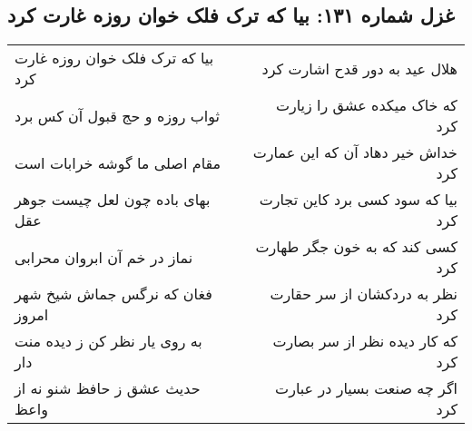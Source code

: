 \begin{center}
\section*{غزل شماره ۱۳۱: بیا که ترک فلک خوان روزه غارت کرد}
\label{sec:sh131}
\begin{longtable}{l p{0.5cm} r}
بیا که ترک فلک خوان روزه غارت کرد
&&
هلال عید به دور قدح اشارت کرد
\\
ثواب روزه و حج قبول آن کس برد
&&
که خاک میکده عشق را زیارت کرد
\\
مقام اصلی ما گوشه خرابات است
&&
خداش خیر دهاد آن که این عمارت کرد
\\
بهای باده چون لعل چیست جوهر عقل
&&
بیا که سود کسی برد کاین تجارت کرد
\\
نماز در خم آن ابروان محرابی
&&
کسی کند که به خون جگر طهارت کرد
\\
فغان که نرگس جماش شیخ شهر امروز
&&
نظر به دردکشان از سر حقارت کرد
\\
به روی یار نظر کن ز دیده منت دار
&&
که کار دیده نظر از سر بصارت کرد
\\
حدیث عشق ز حافظ شنو نه از واعظ
&&
اگر چه صنعت بسیار در عبارت کرد
\\
\end{longtable}
\end{center}
